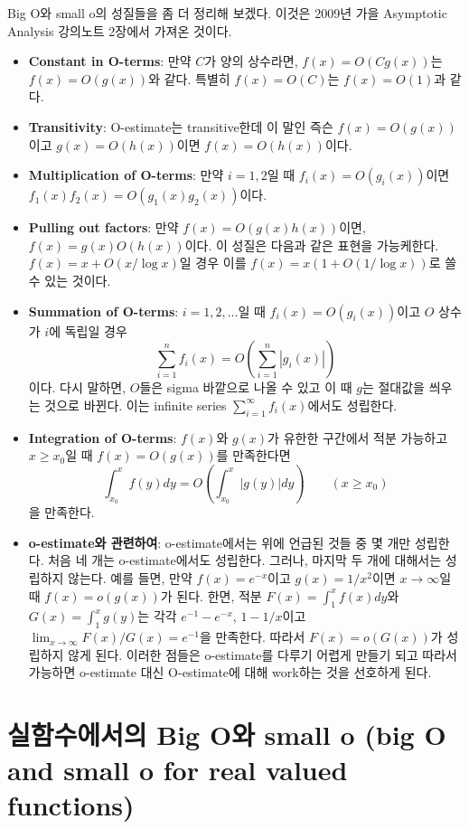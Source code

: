 \documentclass[b5paper,]{scrbook}
\theoremstyle{plain}
\theoremstyle{definition}
\numberwithin{equation}{section}
\begin{document}
Big O와 small o의 성질들을 좀 더 정리해 보겠다. 이것은 2009년 가을 Asymptotic Analysis 강의노트 2장에서 가져온 것이다.

\begin{itemize}
\item
  \textbf{Constant in O-terms}: 만약 \(C\)가 양의 상수라면, \(f(x)=O(Cg(x))\)는 \(f(x)=O(g(x))\)와 같다. 특별히 \(f(x)=O(C)\)는 \(f(x)=O(1)\)과 같다.
\item
  \textbf{Transitivity}: O-estimate는 transitive한데 이 말인 즉슨 \(f(x)=O(g(x))\)이고 \(g(x)=O(h(x))\)이면 \(f(x)=O(h(x))\)이다.
\item
  \textbf{Multiplication of O-terms}: 만약 \(i=1,2\)일 때 \(f_{i}(x)=O(g_{i}(x))\)이면 \(f_{1}(x)f_{2}(x)=O(g_{1}(x)g_{2}(x))\)이다.
\item
  \textbf{Pulling out factors}: 만약 \(f(x)=O(g(x)h(x))\)이면, \(f(x)=g(x)O(h(x))\)이다. 이 성질은 다음과 같은 표현을 가능케한다. \(f(x)=x+O(x/\log x)\)일 경우 이를 \(f(x)=x(1+O(1/\log x))\)로 쓸 수 있는 것이다.
\item
  \textbf{Summation of O-terms}: \(i=1,2,\ldots\)일 때 \(f_{i}(x)=O(g_{i}(x))\)이고 \(O\) 상수가 \(i\)에 독립일 경우
  \[\sum_{i=1}^{n}f_{i}(x)=O(\sum_{i=1}^{n}|g_{i}(x)|)\]
  이다. 다시 말하면, \(O\)들은 sigma 바깥으로 나올 수 있고 이 때 \(g\)는 절대값을 씌우는 것으로 바뀐다. 이는 infinite series \(\sum_{i=1}^{\infty}f_{i}(x)\)에서도 성립한다.
\item
  \textbf{Integration of O-terms}: \(f(x)\)와 \(g(x)\)가 유한한 구간에서 적분 가능하고 \(x\geq x_{0}\)일 때 \(f(x)=O(g(x))\)를 만족한다면
  \[\int_{x_{0}}^{x}f(y)dy=O(\int_{x_{0}}^{x}|g(y)|dy)\qquad{(x\geq x_{0})}\]
  을 만족한다.
\item
  \textbf{o-estimate와 관련하여}: o-estimate에서는 위에 언급된 것들 중 몇 개만 성립한다. 처음 네 개는 o-estimate에서도 성립한다. 그러나, 마지막 두 개에 대해서는 성립하지 않는다. 예를 들면, 만약 \(f(x)=e^{-x}\)이고 \(g(x)=1/x^{2}\)이면 \(x\rightarrow\infty\)일 때 \(f(x)=o(g(x))\)가 된다. 한면, 적분 \(F(x)=\int_{1}^{x}f(x)dy\)와 \(G(x)=\int_{1}^{x}g(y)\)는 각각 \(e^{-1}-e^{-x}\), \(1-1/x\)이고 \(\lim_{x\rightarrow\infty}F(x)/G(x)=e^{-1}\)을 만족한다. 따라서 \(F(x)=o(G(x))\)가 성립하지 않게 된다. 이러한 점들은 o-estimate를 다루기 어렵게 만들기 되고 따라서 가능하면 o-estimate 대신 O-estimate에 대해 work하는 것을 선호하게 된다.
\end{itemize}

\hypertarget{-big-o-small-o-big-o-and-small-o-for-real-valued-functions}{%
\section{실함수에서의 Big O와 small o (big O and small o for real valued functions)}\label{-big-o-small-o-big-o-and-small-o-for-real-valued-functions}}
\end{document}
